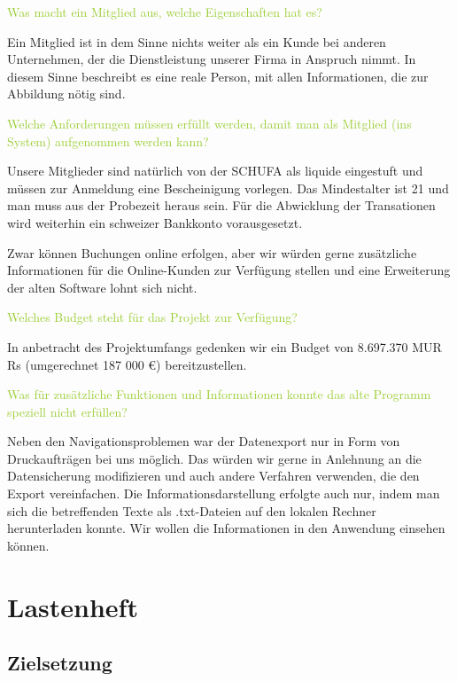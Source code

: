 \textcolor{YellowGreen}{Was macht ein Mitglied aus, welche Eigenschaften hat es?}

\textcolor{NavyBlue}{Ein Mitglied ist in dem Sinne nichts weiter als ein Kunde bei anderen Unternehmen, der die Dienstleistung unserer Firma in Anspruch nimmt. In diesem Sinne beschreibt es eine reale Person, mit allen Informationen, die zur Abbildung nötig sind. } %

\textcolor{YellowGreen}{Welche Anforderungen müssen erfüllt werden, damit man als Mitglied (ins System) aufgenommen werden kann?}

\textcolor{NavyBlue}{Unsere Mitglieder sind natürlich von der SCHUFA als liquide eingestuft und müssen zur Anmeldung eine Bescheinigung vorlegen. Das Mindestalter ist 21 und man muss aus der Probezeit heraus sein. Für die Abwicklung der Transationen wird weiterhin ein schweizer Bankkonto vorausgesetzt.}

Zwar können Buchungen online erfolgen, aber wir würden gerne zusätzliche Informationen für die Online-Kunden zur Verfügung stellen und eine Erweiterung der alten Software lohnt sich nicht.

\textcolor{YellowGreen}{Welches Budget steht für das Projekt zur Verfügung?}

\textcolor{NavyBlue}{In anbetracht des Projektumfangs gedenken wir ein Budget von 8.697.370 MUR Rs (umgerechnet 187 000 €) bereitzustellen.}

\textcolor{YellowGreen}{Was für zusätzliche Funktionen und Informationen konnte das alte Programm speziell nicht erfüllen?}

\textcolor{NavyBlue}{Neben den Navigationsproblemen war der Datenexport nur in Form von Druckaufträgen bei uns möglich. Das würden wir gerne in Anlehnung an die Datensicherung modifizieren und auch andere Verfahren verwenden, die den Export vereinfachen. Die Informationsdarstellung erfolgte auch nur, indem man sich die betreffenden Texte als .txt-Dateien auf den lokalen Rechner herunterladen konnte. Wir wollen die Informationen in den Anwendung einsehen können.}

\section{Lastenheft}

\subsection{Zielsetzung}

